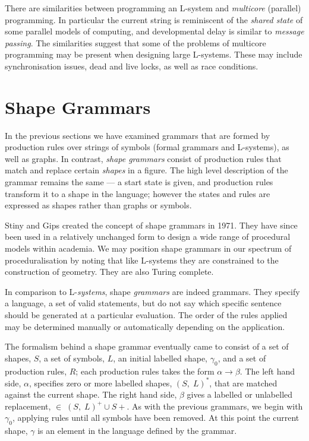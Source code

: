There are similarities between programming an L-system and \emph{multicore} (parallel) programming. In particular the current string is reminiscent of the \emph{shared state} of some parallel models of computing, and developmental delay\cite{Prusinkiewicz88} is similar to \emph{message passing}. The similarities suggest that some of the problems of multicore programming may be present when designing large L-systems. These may include synchronisation issues, dead and live locks, as well as race conditions.

\section{Shape Grammars}
\label{s:shapegrammars}

In the previous sections we have examined grammars that are formed by production rules over strings of symbols (formal grammars and L-systems), as well as graphs. In contrast, \emph{shape grammars} consist of production rules that match and replace certain \emph{shapes} in a figure. The high level description of the grammar remains the same --- a start state is given, and production rules transform it to a shape in the language; however the states and rules are expressed as shapes rather than graphs or symbols. 

Stiny and Gips created the concept of shape grammars in 1971\cite{Stiny71}. They have since been used in a relatively unchanged form to design a wide range of procedural models within academia. We may position shape grammars in our spectrum of proceduralisation by noting that like L-systems they are constrained to the construction of geometry. They are also Turing complete\cite{Gips99}. 

In comparison to L-\emph{systems}, shape \emph{grammars} are indeed grammars. They specify a language, a set of valid statements, but do not say which specific sentence should be generated at a particular evaluation. The order of the rules applied may be determined manually or automatically depending on the application.

The formalism behind a shape grammar eventually\cite{Stiny80} came to consist of a set of shapes, $S$, a set of symbols, $L$, an initial labelled shape, $\gamma_0$, and a set of production rules, $R$; each production rules takes the form $\alpha \rightarrow \beta$. The left hand side, $\alpha$, specifies zero or more labelled shapes, $(S,\; L)^*$, that are matched against the current shape. The right hand side, $\beta$ gives a labelled or unlabelled replacement, $\in\;(S,\;L)^+\cup S+$. As with the previous grammars, we begin with $\gamma_0$, applying rules until all symbols have been removed. At this point the current shape, $\gamma$ is an element in the language defined by the grammar. 

